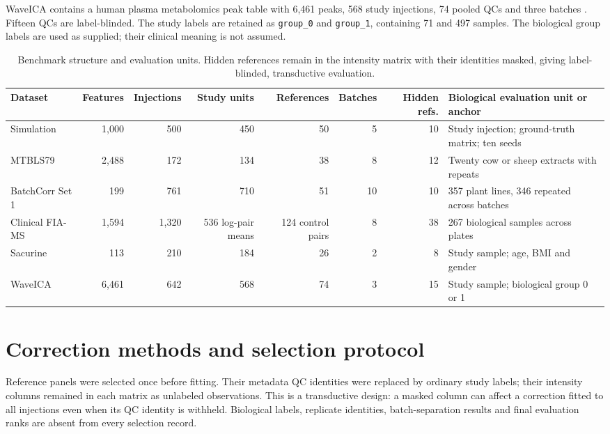 \documentclass[namedate,webpdf,modern,large,nocrop]{oup-authoring-template}
\begin{document}
WaveICA contains a human plasma metabolomics peak table with 6,461 peaks, 568 study injections, 74 pooled QCs and three batches \citep{Deng2021WaveICA}. Fifteen QCs are label-blinded. The study labels are retained as \texttt{group\_0} and \texttt{group\_1}, containing 71 and 497 samples. The biological group labels are used as supplied; their clinical meaning is not assumed.

\begin{table}[tbp]
\centering
\small
\caption{Benchmark structure and evaluation units. Hidden references remain in the intensity matrix with their identities masked, giving label-blinded, transductive evaluation.}
\label{tab:supp_design}
\begin{tabular}{lrrrrrrp{4.3cm}}
\toprule
Dataset & Features & Injections & Study units & References & Batches & Hidden refs. & Biological evaluation unit or anchor \\
\midrule
Simulation & 1,000 & 500 & 450 & 50 & 5 & 10 & Study injection; ground-truth matrix; ten seeds \\
MTBLS79 & 2,488 & 172 & 134 & 38 & 8 & 12 & Twenty cow or sheep extracts with repeats \\
BatchCorr Set 1 & 199 & 761 & 710 & 51 & 10 & 10 & 357 plant lines, 346 repeated across batches \\
Clinical FIA-MS & 1,594 & 1,320 & 536 log-pair means & 124 control pairs & 8 & 38 & 267 biological samples across plates \\
Sacurine & 113 & 210 & 184 & 26 & 2 & 8 & Study sample; age, BMI and gender \\
WaveICA & 6,461 & 642 & 568 & 74 & 3 & 15 & Study sample; biological group 0 or 1 \\
\bottomrule
\end{tabular}
\end{table}

\section{Correction methods and selection protocol}
\label{sec:supp_methods}

Reference panels were selected once before fitting. Their metadata QC identities were replaced by ordinary study labels; their intensity columns remained in each matrix as unlabeled observations. This is a transductive design: a masked column can affect a correction fitted to all injections even when its QC identity is withheld. Biological labels, replicate identities, batch-separation results and final evaluation ranks are absent from every selection record.
\end{document}
